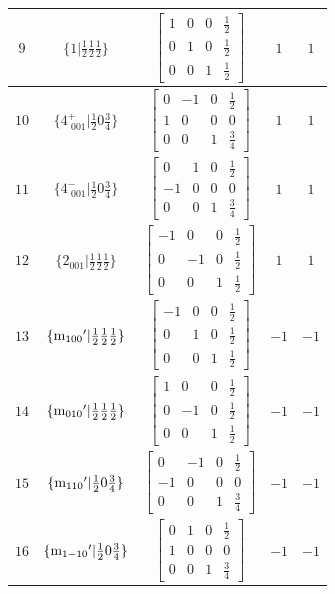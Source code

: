 \documentclass[fleqn,8pt]{jsarticle}
\begin{document}
\begin{longtable}{ccccc}
$ 9 $ & $ \{1|\frac{1}{2} \frac{1}{2} \frac{1}{2}\} $ & $ \begin{bmatrix} 1 & 0 & 0 & \frac{1}{2} \\ 0 & 1 & 0 & \frac{1}{2} \\ 0 & 0 & 1 & \frac{1}{2} \end{bmatrix} $ & $ 1 $ & $ 1 $ \\ \hline
$ 10 $ & $ \{4^{+}_{\,\,001}|\frac{1}{2} 0 \frac{3}{4}\} $ & $ \begin{bmatrix} 0 & -1 & 0 & \frac{1}{2} \\ 1 & 0 & 0 & 0 \\ 0 & 0 & 1 & \frac{3}{4} \end{bmatrix} $ & $ 1 $ & $ 1 $ \\ \hline
$ 11 $ & $ \{4^{-}_{\,\,001}|\frac{1}{2} 0 \frac{3}{4}\} $ & $ \begin{bmatrix} 0 & 1 & 0 & \frac{1}{2} \\ -1 & 0 & 0 & 0 \\ 0 & 0 & 1 & \frac{3}{4} \end{bmatrix} $ & $ 1 $ & $ 1 $ \\ \hline
$ 12 $ & $ \{2{}_{001}|\frac{1}{2} \frac{1}{2} \frac{1}{2}\} $ & $ \begin{bmatrix} -1 & 0 & 0 & \frac{1}{2} \\ 0 & -1 & 0 & \frac{1}{2} \\ 0 & 0 & 1 & \frac{1}{2} \end{bmatrix} $ & $ 1 $ & $ 1 $ \\ \hline
$ 13 $ & $ \{{\rm m}_{100}{}'|\frac{1}{2} \frac{1}{2} \frac{1}{2}\} $ & $ \begin{bmatrix} -1 & 0 & 0 & \frac{1}{2} \\ 0 & 1 & 0 & \frac{1}{2} \\ 0 & 0 & 1 & \frac{1}{2} \end{bmatrix} $ & $ -1 $ & $ -1 $ \\ \hline
$ 14 $ & $ \{{\rm m}_{010}{}'|\frac{1}{2} \frac{1}{2} \frac{1}{2}\} $ & $ \begin{bmatrix} 1 & 0 & 0 & \frac{1}{2} \\ 0 & -1 & 0 & \frac{1}{2} \\ 0 & 0 & 1 & \frac{1}{2} \end{bmatrix} $ & $ -1 $ & $ -1 $ \\ \hline
$ 15 $ & $ \{{\rm m}_{110}{}'|\frac{1}{2} 0 \frac{3}{4}\} $ & $ \begin{bmatrix} 0 & -1 & 0 & \frac{1}{2} \\ -1 & 0 & 0 & 0 \\ 0 & 0 & 1 & \frac{3}{4} \end{bmatrix} $ & $ -1 $ & $ -1 $ \\ \hline
$ 16 $ & $ \{{\rm m}_{1-10}{}'|\frac{1}{2} 0 \frac{3}{4}\} $ & $ \begin{bmatrix} 0 & 1 & 0 & \frac{1}{2} \\ 1 & 0 & 0 & 0 \\ 0 & 0 & 1 & \frac{3}{4} \end{bmatrix} $ & $ -1 $ & $ -1 $ \\
\end{longtable}
\end{document}
